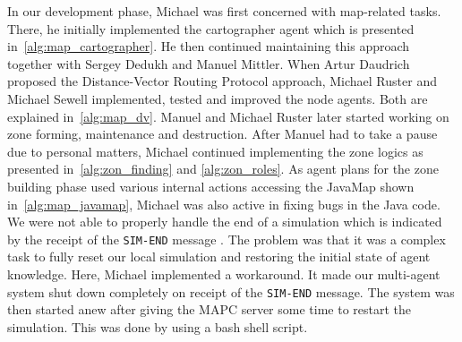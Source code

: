 In our development phase, Michael was first concerned with map-related tasks.
There, he initially implemented the cartographer agent which is presented in~\autoref{alg:map_cartographer}. %
He then continued maintaining this approach together with Sergey Dedukh and Manuel Mittler.
When Artur Daudrich proposed the Distance-Vector Routing Protocol approach, Michael Ruster and Michael Sewell implemented, tested and improved the node agents.
Both are explained in~\autoref{alg:map_dv}. %
Manuel and Michael Ruster later started working on zone forming, maintenance and destruction. %
After Manuel had to take a pause due to personal matters, Michael continued implementing the zone logics as presented in~\autoref{alg:zon_finding} and \autoref{alg:zon_roles}.
As agent plans for the zone building phase used various internal actions accessing the JavaMap shown in~\ref{alg:map_javamap}, Michael was also active in fixing bugs in the Java code.
We were not able to properly handle the end of a simulation which is indicated by the receipt of the \texttt{SIM-END} message \cite{ahlbrecht_protocol_2014}.
The problem was that it was a complex task to fully reset our local simulation and restoring the initial state of agent knowledge.
Here, Michael implemented a workaround.
It made our multi-agent system shut down completely on receipt of the \texttt{SIM-END} message.
The system was then started anew after giving the MAPC server some time to restart the simulation.
This was done by using a bash shell script.
